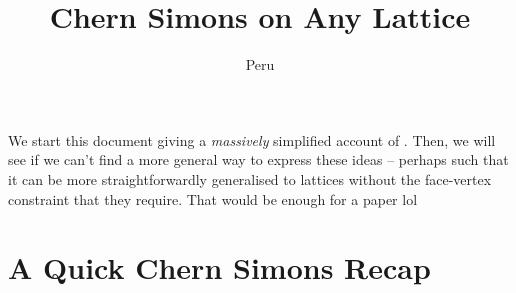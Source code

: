 \documentclass[11pt, oneside]{article} %
\title{\textbf{Chern Simons on Any Lattice}}
\author{Peru}
\date{}
\numberwithin{equation}{section}
\begin{document}
\maketitle

\tableofcontents

\begin{shaded}
    We start this document giving a \textit{massively} simplified account of \cite{sun_fradkin_2015}. Then, we will see if we can't find a more general way to express these ideas -- perhaps such that it can be more straightforwardly generalised to lattices without the face-vertex constraint that they require. That would be enough for a paper lol
\end{shaded}

\section{A Quick Chern Simons Recap}
\end{document}
